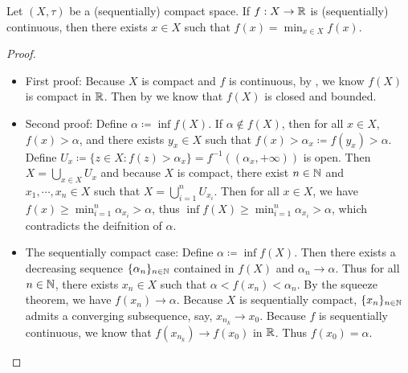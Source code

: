 \documentclass[screen]{techreport}
\numberwithin{equation}{section}
\begin{document}
\begin{theorem}\label{The:Weierstrass}
	Let $(X,\tau)$ be a (sequentially) compact space.
	If $f: X\to\mathbb{R}$ is (sequentially) continuous, then there exists $x \in X$ such that $f(x) = \min_{x \in X} f(x)$.
\end{theorem}
\begin{proof}
	\begin{itemize}
		\item First proof: Because $X$ is compact and $f$ is continuous, by , we know $f(X)$ is compact in $\mathbb{R}$.
		Then by  we know that $f(X)$ is closed and bounded.
		
		\item Second proof: Define $\alpha \coloneqq \inf f(X)$.
		If $\alpha \not\in f(X)$, then for all $x \in X$, $f(x) > \alpha$, and there exists $y_x \in X$ such that $f(x) > \alpha_x \coloneqq f(y_x) > \alpha$.
		Define $U_x \coloneqq \{ z \in X : f(z) > \alpha_x \} = f^{-1}((\alpha_x,+\infty))$ is open.
		Then $X = \bigcup_{x \in X} U_x$ and because $X$ is compact, there exist $n \in \mathbb{N}$ and $x_1,\cdots,x_n \in X$ such that $X = \bigcup_{i=1}^n U_{x_i}$.
		Then for all $x \in X$, we have $f(x) \ge \min_{i=1}^n \alpha_{x_i} > \alpha$, 
		thus $\inf f(X) \ge \min_{i=1}^n \alpha_{x_i} > \alpha$, which contradicts the deifnition of $\alpha$.
		
		\item The sequentially compact case: Define $\alpha \coloneqq \inf f(X)$.
		Then there exists a decreasing sequence $\{\alpha_n\}_{n \in \mathbb{N}}$ contained in $f(X)$ and $\alpha_n \rightarrow \alpha$.
		Thus for all $n \in \mathbb{N}$, there exists $x_n \in X$ such that $\alpha < f(x_n) < \alpha_n$.
		By the squeeze theorem, we have $f(x_n) \rightarrow \alpha$.
		Because $X$ is sequentially compact, $\{x_n\}_{n \in \mathbb{N}}$ admits a converging subsequence, say, $x_{n_k} \rightarrow x_0$.
		Because $f$ is sequentially continuous, we know that $f(x_{n_k}) \rightarrow f(x_0)$ in $\mathbb{R}$.
		Thus $f(x_0) = \alpha$.
	\end{itemize}
\end{proof}
\end{document}
